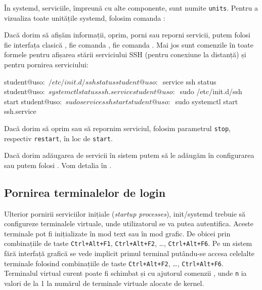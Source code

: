 În systemd, serviciile, împreună cu alte componente, sunt numite \texttt{units}. Pentru a
vizualiza toate unitățile systemd, folosim comanda :


Dacă dorim să afișăm informații, oprim, porni sau reporni servicii, putem folosi
fie interfața clasică , fie comanda , fie comanda .
Mai jos sunt comenzile în toate formele pentru afișarea stării serviciului SSH (pentru conexiune
la distanță) și pentru pornirea serviciului:

\begin{screen}
student@uso:~$ /etc/init.d/ssh status
student@uso:~$ service ssh status
student@uso:~$ systemctl status ssh.service
student@uso:~$ sudo /etc/init.d/ssh start
student@uso:~$ sudo service ssh start
student@uso:~$ sudo systemctl start ssh.service
\end{screen}

Dacă dorim să oprim sau să repornim serviciul, folosim parametrul \texttt{stop},
respectiv \texttt{restart}, în loc de \texttt{start}.

Dacă dorim adăugarea de servicii în sistem putem să le adăugăm în configurarea
 sau putem folosi . Vom detalia în
.

\subsection{Pornirea terminalelor de login}
\label{sec:boot:init-linux:login}

Ulterior pornirii serviciilor inițiale (\textit{startup processes}), init/systemd trebuie să
configureze terminalele virtuale, unde utilizatorul se va putea autentifica. Aceste terminale
pot fi inițializate în mod text sau în mod grafic.
De obicei prin combinațiile de taste \texttt{Ctrl+Alt+F1}, \texttt{Ctrl+Alt+F2}, \ldots,
\texttt{Ctrl+Alt+F6}. Pe un sistem fără interfață grafică se
vede implicit primul terminal putându-se accesa celelalte terminale folosind
combinațiile de taste \texttt{Ctrl+Alt+F2}, \ldots, \texttt{Ctrl+Alt+F6}.
Terminalul virtual curent poate fi schimbat și cu ajutorul comenzii , unde \texttt{n} ia
valori de la 1 la numărul de terminale virtuale alocate de kernel.

